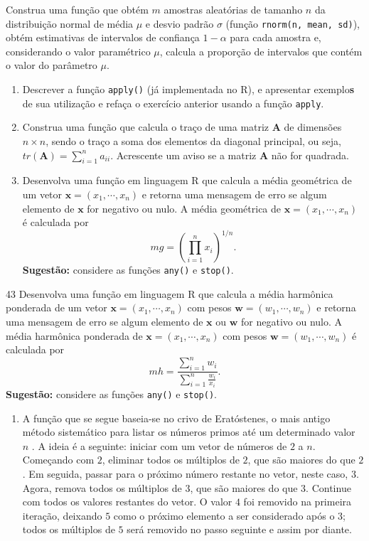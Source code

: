 \documentclass[
]{article}
\providecommand{\tightlist}{%
  \setlength{\itemsep}{0pt}\setlength{\parskip}{0pt}}
\begin{document}
Construa uma função que obtém \(m\) amostras aleatórias de tamanho \(n\)
da distribuição normal de média \(\mu\) e desvio padrão \(\sigma\)
(função \texttt{rnorm(n,\ mean,\ sd)}), obtém estimativas de intervalos
de confiança \(1 - \alpha\) para cada amostra e, considerando o valor
paramétrico \(\mu\), calcula a proporção de intervalos que contém o
valor do parâmetro \(\mu\).

\begin{enumerate}
\def\labelenumi{\arabic{enumi}.}
\setcounter{enumi}{39}
\item
  Descrever a função \texttt{apply()} (já implementada no R), e
  apresentar exemplo\textbf{s} de sua utilização e refaça o exercício
  anterior usando a função \texttt{apply}.
\item
  Construa uma função que calcula o traço de uma matriz \(\mathbf{A}\)
  de dimensões \(n \times n\), sendo o traço a soma dos elementos da
  diagonal principal, ou seja,
  \(tr(\mathbf{A}) = \sum_{i = 1}^n a_{ii}\). Acrescente um aviso se a
  matriz \(\mathbf{A}\) não for quadrada.
\item
  Desenvolva uma função em linguagem R que calcula a média geométrica de
  um vetor \(\mathbf{x} = (x_1,\cdots,x_n)\) e retorna uma mensagem de
  erro se algum elemento de \(\mathbf{x}\) for negativo ou nulo. A média
  geométrica de \(\mathbf{x} = (x_1,\cdots,x_n)\) é calculada por \[
  mg = \left(\prod_{i = 1}^n x_i \right)^{1/n}.
  \] \textbf{Sugestão:} considere as funções \texttt{any()} e
  \texttt{stop()}.
\end{enumerate}

43 Desenvolva uma função em linguagem R que calcula a média harmônica
ponderada de um vetor \(\mathbf{x} = (x_1,\cdots,x_n)\) com pesos
\(\mathbf{w} = (w_1,\cdots,w_n)\) e retorna uma mensagem de erro se
algum elemento de \(\mathbf{x}\) ou \(\mathbf{w}\) for negativo ou nulo.
A média harmônica ponderada de \(\mathbf{x} = (x_1,\cdots,x_n)\) com
pesos \(\mathbf{w} = (w_1,\cdots,w_n)\) é calculada por \[
mh = \frac{\sum_{i = 1}^n w_i}{\sum_{i = 1}^n \frac{w_i}{x_i} }.
\] \textbf{Sugestão:} considere as funções \texttt{any()} e
\texttt{stop()}.

\begin{enumerate}
\def\labelenumi{\arabic{enumi}.}
\setcounter{enumi}{43}
\tightlist
\item
  A função que se segue baseia-se no crivo de Eratóstenes, o mais antigo
  método sistemático para listar os números primos até um determinado
  valor \(n\) . A ideia é a seguinte: iniciar com um vetor de números de
  \(2\) a \(n\). Começando com \(2\), eliminar todos os múltiplos de
  \(2\), que são maiores do que \(2\). Em seguida, passar para o próximo
  número restante no vetor, neste caso, \(3\). Agora, remova todos os
  múltiplos de \(3\), que são maiores do que \(3\). Continue com todos
  os valores restantes do vetor. O valor \(4\) foi removido na primeira
  iteração, deixando \(5\) como o próximo elemento a ser considerado
  após o \(3\); todos os múltiplos de \(5\) será removido no passo
  seguinte e assim por diante.
\end{enumerate}
\end{document}
